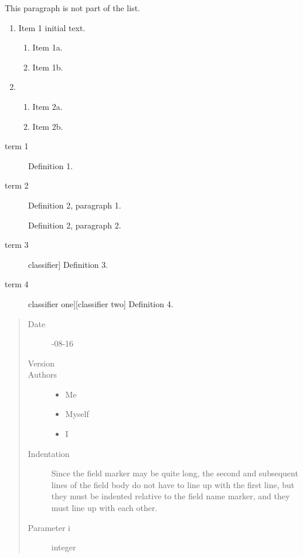 \documentclass[letterpaper,10pt,english]{sphinxmanual}
\begin{document}
This paragraph is not part of the list.
\begin{enumerate}
\item {} 
Item 1 initial text.
\begin{enumerate}
\item {} 
Item 1a.

\item {} 
Item 1b.

\end{enumerate}

\item {} \begin{enumerate}
\item {} 
Item 2a.

\item {} 
Item 2b.

\end{enumerate}

\end{enumerate}
\begin{description}
\item[{term 1}] \leavevmode
Definition 1.

\item[{term 2}] \leavevmode
Definition 2, paragraph 1.

Definition 2, paragraph 2.

\item[{term 3}] \leavevmode{[}classifier{]}
Definition 3.

\item[{term 4}] \leavevmode{[}classifier one{]}{[}classifier two{]}
Definition 4.

\end{description}
\begin{quote}\begin{description}
\item[{Date}] -08-16

\item[{Version}] 

\item[{Authors}] \leavevmode\begin{itemize}
\item {} 
Me

\item {} 
Myself

\item {} 
I

\end{itemize}

\item[{Indentation}] \leavevmode
Since the field marker may be quite long, the second
and subsequent lines of the field body do not have to line up
with the first line, but they must be indented relative to the
field name marker, and they must line up with each other.

\item[{Parameter i}] \leavevmode
integer

\end{description}\end{quote}
\end{document}
